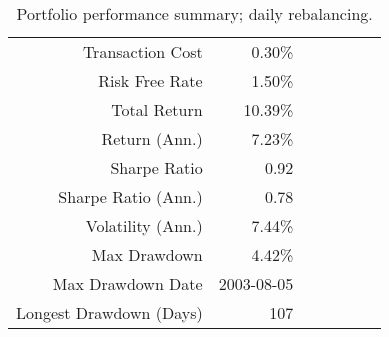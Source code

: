 \begin{table}[p]
\centering
\caption{Portfolio performance summary; daily rebalancing.}
\begin{tabular}{rrrrrrr}
\toprule
\midrule
Transaction Cost & 0.30\% \\
Risk Free Rate & 1.50\% \\
\hline
Total Return & 10.39\% \\
Return (Ann.) & 7.23\% \\
Sharpe Ratio & 0.92 \\
Sharpe Ratio (Ann.) & 0.78 \\
Volatility (Ann.) & 7.44\% \\
Max Drawdown & 4.42\% \\
Max Drawdown Date & 2003-08-05 \\
Longest Drawdown (Days) & 107 \\
\bottomrule
\end{tabular}
\end{table}
